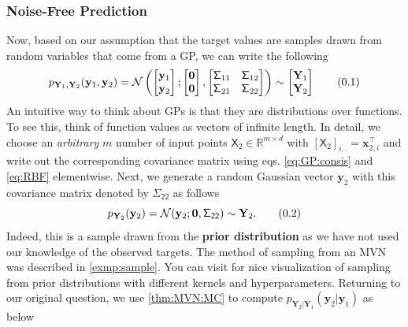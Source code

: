 \documentclass[10pt]{article}
\theoremstyle{definition}
\theoremstyle{definition}
\theoremstyle{remark}
\newcommand\eqnum{\addtocounter{equation}{1}\tag{\arabic{section}.\arabic{equation}}}
\begin{document}
\subsubsection{Noise-Free Prediction}
Now, based on our assumption that the target values are samples drawn from random variables that come from a GP, we can write the following
\begin{equation*}
p_{\mathbf{Y}_{1}, \mathbf{Y}_{2}}(\mathbf{y}_{1}, \mathbf{y}_{2}) =
\mathcal{N} \left(
\begin{bmatrix}
\mathbf{y}_1 \\
\mathbf{y}_2
\end{bmatrix} ;
\begin{bmatrix}
\mathbf{0} \\
\mathbf{0}
\end{bmatrix} ,
\begin{bmatrix}
\mathsf{\Sigma}_{11} & \mathsf{\Sigma}_{12} \\
\mathsf{\Sigma}_{21} & \mathsf{\Sigma}_{22} 
\end{bmatrix}
\right) \sim
\begin{bmatrix}
\mathbf{Y}_1 \\
\mathbf{Y}_2
\end{bmatrix}
\eqnum
\label{eq:GP:joint}
\end{equation*}
An intuitive way to think about GPs is that they are distributions over functions. To see this, think of function values as vectors of infinite length. In detail, we choose an \textit{arbitrary} $m$ number of input points $\mathsf{X}_2 \in \mathbb{R}^{m\times d}$ with $[\mathsf{X}_2]_{i,.}=\mathbf{x}_{2,i}^{\top}$ and write out the corresponding covariance matrix using eqs. \eqref{eq:GP:consis} and \eqref{eq:RBF} elementwise. Next, we generate a random Gaussian vector $\mathbf{y}_{2}$ with this covariance matrix denoted by $\mathsf{\Sigma_{22}}$ as follows
\begin{equation*}
p_{\mathbf{Y}_{2}}(\mathbf{y}_{2}) = \mathcal{N}(\mathbf{y}_{2}; \mathbf{0}, \mathsf{\Sigma_{22}}) \sim \mathbf{Y}_{2}.
\eqnum
\label{eq:GP:prior}
\end{equation*}
Indeed, this is a sample drawn from the \textbf{prior distribution} as we have not used our knowledge of the observed targets. The method of sampling from an MVN was described in \cref{exmp:sample}. You can visit \cite{Gortler2019} for nice visualization of sampling from prior distributions with different kernels and hyperparameters. Returning to our original question, we use \cref{thm:MVN:MC} to compute $p_{\mathbf{Y}_2|\mathbf{Y}_1}(\mathbf{y}_2|\mathbf{y}_1)$ as below
\end{document}
